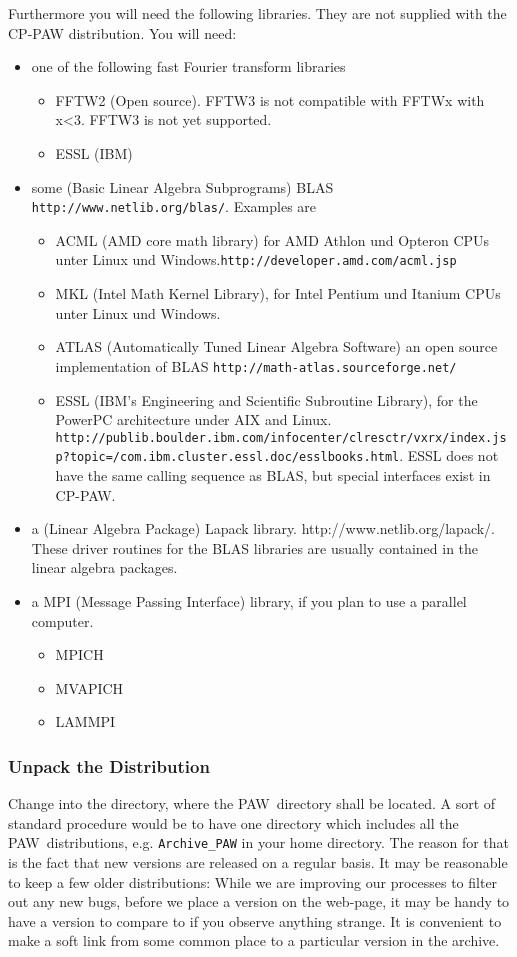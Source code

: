 \documentclass[a4paper,10pt]{article}
\newcommand{\PAW}{\textsc{PAW}}
\begin{document}
Furthermore you will need the following libraries. They are not
supplied with the CP-PAW distribution. You will need:
\begin{itemize}
\item one of the following fast Fourier transform libraries
\begin{itemize}
\item FFTW2 (Open source). FFTW3 is not compatible with FFTWx with x<3. FFTW3 is not yet supported.
\item ESSL (IBM)
\end{itemize}
\item some (Basic Linear Algebra Subprograms) BLAS
  \texttt{http://www.netlib.org/blas/}. Examples are
\begin{itemize}
\item ACML (AMD core math library) for AMD Athlon und Opteron CPUs
  unter Linux und Windows.\texttt{http://developer.amd.com/acml.jsp}
\item MKL (Intel Math Kernel Library), for Intel Pentium und Itanium CPUs unter Linux und Windows.
\item ATLAS (Automatically Tuned Linear Algebra Software) an open
  source implementation of BLAS
  \texttt{http://math-atlas.sourceforge.net/}
\item ESSL (IBM's Engineering and Scientific Subroutine Library), for
  the PowerPC architecture under AIX and Linux.
  \texttt{http://publib.boulder.ibm.com/infocenter/clresctr/vxrx/index.jsp?topic=/com.ibm.cluster.essl.doc/esslbooks.html}.
  ESSL does not have the same calling sequence as BLAS, but special
  interfaces exist in CP-PAW.
\end{itemize}
\item a (Linear Algebra Package) Lapack library.
  http://www.netlib.org/lapack/. These driver routines for the BLAS
  libraries are usually contained in the linear algebra packages.
\item a MPI (Message Passing Interface) library, if you plan to use a
  parallel computer.
\begin{itemize}
\item MPICH
\item MVAPICH
\item LAMMPI
\end{itemize}
\end{itemize}

\subsubsection*{Unpack the Distribution}
\label{sub:unpack}
Change into the directory, where the \PAW\ directory shall be located.
A sort of standard procedure would be to have one directory which
includes all the \PAW\ distributions, e.g. \texttt{Archive\_PAW} in
your home directory.  The reason for that is the fact that new
versions are released on a regular basis. It may be reasonable to keep
a few older distributions: While we are improving our processes to
filter out any new bugs, before we place a version on the web-page, it
may be handy to have a version to compare to if you observe anything
strange. It is convenient to make a soft link from some common place
to a particular version in the archive.
\end{document}
